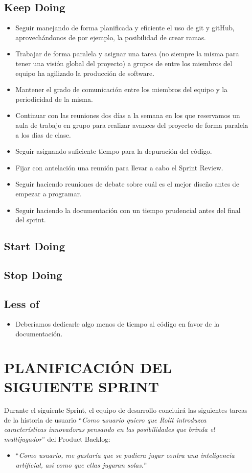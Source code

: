 \documentclass{article}
\begin{document}
\subsection{Keep Doing}
\begin{itemize}
\item
  Seguir manejando de forma planificada y eficiente el uso de git y
  gitHub, aprovechándonos de por ejemplo, la posibilidad de crear ramas.
\item
  Trabajar de forma paralela y asignar una tarea (no siempre la misma
  para tener una visión global del proyecto) a grupos de entre los
  miembros del equipo ha agilizado la producción de software.
\item
  Mantener el grado de comunicación entre los miembros del equipo y la
  periodicidad de la misma.
\item
  Continuar con las reuniones dos días a la semana en los que reservamos
  un aula de trabajo en grupo para realizar avances del proyecto de
  forma paralela a los días de clase.
\item
  Seguir asignando suficiente tiempo para la depuración del código.
\item
  Fijar con antelación una reunión para llevar a cabo el Sprint Review.
\item
  Seguir haciendo reuniones de debate sobre cuál es el mejor diseño
  antes de empezar a programar.
\item
  Seguir haciendo la documentación con un tiempo prudencial antes del
  final del sprint.
\end{itemize}

\subsection{Start Doing}

\subsection{Stop Doing}

\subsection{Less of}
\begin{itemize}
\item
  Deberíamos dedicarle algo menos de tiempo al código en favor de la
  documentación.
\end{itemize}

\section{PLANIFICACIÓN DEL SIGUIENTE SPRINT}
Durante el siguiente Sprint, el equipo de desarrollo concluirá las siguientes tareas de la historia de usuario ``\textit{Como usuario quiero que Rolit introduzca características innovadoras pensando en las posibilidades que brinda el multijugador}'' del Product Backlog:
\begin{itemize}
\item ``\textit{Como usuario, me gustaría que se pudiera jugar
contra una inteligencia artificial, así como que ellas jugaran solas.}''
\end{itemize}
\end{document}
